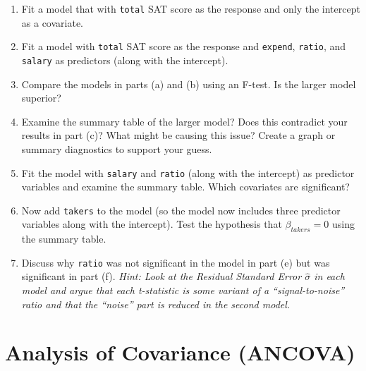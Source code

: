 \documentclass[]{book}
\newenvironment{Shaded}{\begin{snugshade}}{\end{snugshade}}
\newcommand{\KeywordTok}[1]{\textcolor[rgb]{0.13,0.29,0.53}{\textbf{{#1}}}}
\newcommand{\CommentTok}[1]{\textcolor[rgb]{0.56,0.35,0.01}{\textit{{#1}}}}
\newcommand{\NormalTok}[1]{{#1}}
\theoremstyle{definition}
\theoremstyle{definition}
\theoremstyle{remark}
\begin{document}
\begin{enumerate}
  \begin{enumerate}
  \def\labelenumii{\alph{enumii})}
  \item
    Fit a model that with \texttt{total} SAT score as the response and
    only the intercept as a covariate.
  \item
    Fit a model with \texttt{total} SAT score as the response and
    \texttt{expend}, \texttt{ratio}, and \texttt{salary} as predictors
    (along with the intercept).
  \item
    Compare the models in parts (a) and (b) using an F-test. Is the
    larger model superior?
  \item
    Examine the summary table of the larger model? Does this contradict
    your results in part (c)? What might be causing this issue? Create a
    graph or summary diagnostics to support your guess.
  \item
    Fit the model with \texttt{salary} and \texttt{ratio} (along with
    the intercept) as predictor variables and examine the summary table.
    Which covariates are significant?
  \item
    Now add \texttt{takers} to the model (so the model now includes
    three predictor variables along with the intercept). Test the
    hypothesis that \(\beta_{takers}=0\) using the summary table.
  \item
    Discuss why \texttt{ratio} was not significant in the model in part
    (e) but was significant in part (f). \emph{Hint: Look at the
    Residual Standard Error \(\hat{\sigma}\) in each model and argue
    that each t-statistic is some variant of a ``signal-to-noise'' ratio
    and that the ``noise'' part is reduced in the second model.}
  \end{enumerate}
\end{enumerate}

\chapter{Analysis of Covariance
(ANCOVA)}\label{analysis-of-covariance-ancova}

\begin{Shaded}
\end{Shaded}
\end{document}
